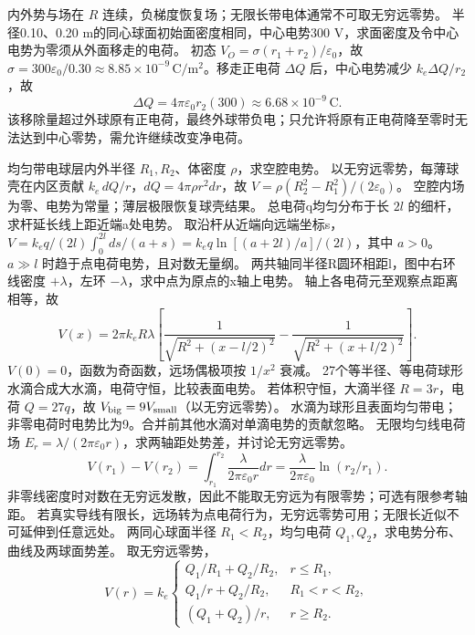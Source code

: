 \crosscheck 内外势与场在 $R$ 连续，负梯度恢复场；无限长带电体通常不可取无穷远零势。
\problemtext 半径0.10、0.20 m的同心球面初始面密度相同，中心电势300 V，求面密度及令中心电势为零须从外面移走的电荷。
\workings 初态 $V_O=\sigma(r_1+r_2)/\varepsilon_0$，故 $\sigma=300\varepsilon_0/0.30\approx8.85\times10^{-9}\,\mathrm{C/m^2}$。移走正电荷 $\Delta Q$ 后，中心电势减少 $k_e\Delta Q/r_2$，故
\[
\Delta Q=4\pi\varepsilon_0r_2(300)\approx6.68\times10^{-9}\,\mathrm C.
\]
\crosscheck 该移除量超过外球原有正电荷，最终外球带负电；只允许将原有正电荷降至零时无法达到中心零势，需允许继续改变净电荷。

\problemtext 均匀带电球层内外半径 $R_1,R_2$、体密度 $\rho$，求空腔电势。
\workings 以无穷远零势，每薄球壳在内区贡献 $k_e\,dQ/r$，$dQ=4\pi\rho r^2dr$，故 $V=\rho(R_2^2-R_1^2)/(2\varepsilon_0)$。
\crosscheck 空腔内场为零、电势为常量；薄层极限恢复球壳结果。
\problemtext 总电荷q均匀分布于长 $2l$ 的细杆，求杆延长线上距近端a处电势。
\workings 取沿杆从近端向远端坐标s，$V=k_eq/(2l)\int_0^{2l}ds/(a+s)=k_eq\ln[(a+2l)/a]/(2l)$，其中 $a>0$。
\crosscheck $a\gg l$ 时趋于点电荷电势，且对数无量纲。
\problemtext 两共轴同半径R圆环相距l，图中右环线密度 $+\lambda$，左环 $-\lambda$，求中点为原点的x轴上电势。
\workings 轴上各电荷元至观察点距离相等，故
\[
V(x)=2\pi k_eR\lambda\left[\frac1{\sqrt{R^2+(x-l/2)^2}}-\frac1{\sqrt{R^2+(x+l/2)^2}}\right].
\]
\crosscheck $V(0)=0$，函数为奇函数，远场偶极项按 $1/x^2$ 衰减。
\problemtext 27个等半径、等电荷球形水滴合成大水滴，电荷守恒，比较表面电势。
\workings 若体积守恒，大滴半径 $R=3r$，电荷 $Q=27q$，故 $V_{\rm big}=9V_{\rm small}$（以无穷远零势）。
\crosscheck 水滴为球形且表面均匀带电；非零电荷时电势比为9。合并前其他水滴对单滴电势的贡献忽略。
\problemtext 无限均匀线电荷场 $E_r=\lambda/(2\pi\varepsilon_0r)$，求两轴距处势差，并讨论无穷远零势。
\workings
\[
V(r_1)-V(r_2)=\int_{r_1}^{r_2}\frac{\lambda}{2\pi\varepsilon_0r}dr
=\frac{\lambda}{2\pi\varepsilon_0}\ln(r_2/r_1).
\]
非零线密度时对数在无穷远发散，因此不能取无穷远为有限零势；可选有限参考轴距。
\crosscheck 若真实导线有限长，远场转为点电荷行为，无穷远零势可用；无限长近似不可延伸到任意远处。
\problemtext 两同心球面半径 $R_1<R_2$，均匀电荷 $Q_1,Q_2$，求电势分布、曲线及两球面势差。
\workings 取无穷远零势，
\[
V(r)=k_e\begin{cases}
Q_1/R_1+Q_2/R_2,&r\le R_1,\\
Q_1/r+Q_2/R_2,&R_1<r<R_2,\\
(Q_1+Q_2)/r,&r\ge R_2.
\end{cases}
\]
